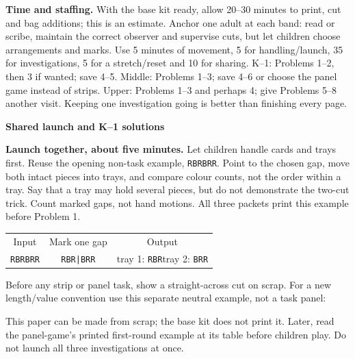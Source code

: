 \documentclass[11pt]{article}
\newcommand{\head}[1]{\par\textbf{\large #1}\par}
\newcommand{\seq}[1]{\texttt{#1}}
\begin{document}
\textbf{Time and staffing.} With the base kit ready, allow 20--30 minutes to print, cut and bag additions; this is an estimate. Anchor one adult at each band: read or scribe, maintain the correct observer and supervise cuts, but let children choose arrangements and marks. Use 5 minutes of movement, 5 for handling/launch, 35 for investigations, 5 for a stretch/reset and 10 for sharing. K--1: Problems 1--2, then 3 if wanted; save 4--5. Middle: Problems 1--3; save 4--6 or choose the panel game instead of strips. Upper: Problems 1--3 and perhaps 4; give Problems 5--8 another visit. Keeping one investigation going is better than finishing every page.
\newpage
\head{Shared launch and K--1 solutions}
\textbf{Launch together, about five minutes.} Let children handle cards and trays first. Reuse the opening non-task example, \seq{RBRBRR}. Point to the chosen gap, move both intact pieces into trays, and compare colour counts, not the order within a tray. Say that a tray may hold several pieces, but do not demonstrate the two-cut trick. Count marked gaps, not hand motions. All three packets print this example before Problem 1.
\begin{center}
\begin{tabular}{ccc}
Input & Mark one gap & Output\\[3pt]
\seq{RBRBRR} & \seq{RBR|BRR} & tray 1: \seq{RBR}\quad tray 2: \seq{BRR}
\end{tabular}
\end{center}
Before any strip or panel task, show a straight-across cut on scrap. For a new length/value convention use this separate neutral example, not a task panel:
\begin{center}
\end{center}
This paper can be made from scrap; the base kit does not print it. Later, read the panel-game's printed first-round example at its table before children play. Do not launch all three investigations at once.
\end{document}
